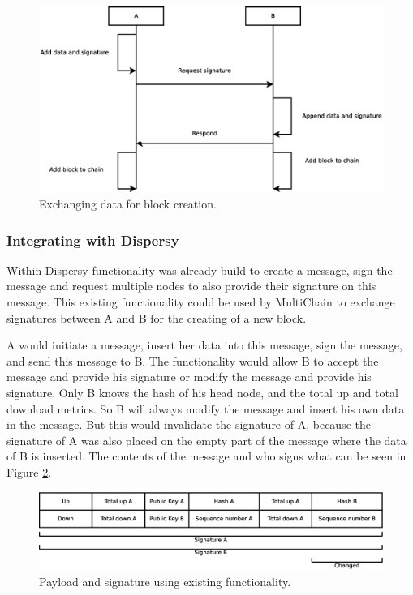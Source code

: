 \begin{figure}[tbp]
	\centerline{\includegraphics[scale=0.3]{design/figs/exchange_new.eps}}
	\caption{Exchanging data for block creation.}
	\label{fig:exchange-new-sequence}
\end{figure}

\subsubsection{Integrating with Dispersy}
Within Dispersy functionality was already build to create a message, sign the message
and request multiple nodes to also provide their signature on this message.
This existing functionality could be used by MultiChain to exchange signatures
between A and B for the creating of a new block.

A would initiate a message, insert her data into this message, sign the message, and send this message to B.
The functionality would allow B to accept the message and provide his signature or
modify the message and provide his signature.
Only B knows the hash of his head node, and the total up and total download metrics.
So B will always modify the message and insert his own data in the message.
But this would invalidate the signature of A,
because the signature of A was also placed on the empty part of the message where the data of B is inserted.
The contents of the message and who signs what can be seen in Figure \ref{fig:payload-signature-old}.

\begin{figure}
	\centerline{\includegraphics[scale=0.3]{design/figs/signature_old.eps}}
	\caption{Payload and signature using existing functionality.}
	\label{fig:payload-signature-old}
\end{figure}

